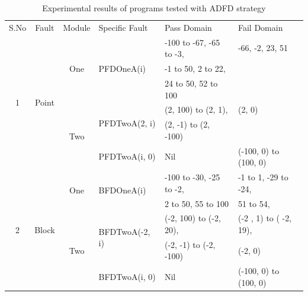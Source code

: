 \bigskip
\begin{table}[h]
\caption{Experimental results of programs tested with ADFD strategy}
\bigskip
\centering
{\renewcommand{\arraystretch}{1.3}
\scriptsize

\begin{tabular}{|c|c|c|l|l|l|}

\hline 


\multirow{2}{*}{S.No}	& \multirow{2}{*}{Fault }	 				& \multirow{2}{*}{Module} 		& \multirow{2}{*}{Specific Fault}	 		& \multirow{2}{*}{Pass Domain} 					& \multirow{2}{*}{Fail Domain} 			\\  
					& Domain								&  Dimension					&									&											&								\\ \hline 
\multirow{6}{*}{1} 	&	\multirow{6}{*}{Point}				& 	\multirow{3}{*}{One}			&	\multirow{3}{*}{PFDOneA(i)}	&	-100 to -67, -65 to -3, 		  		& -66, -2, 23, 51			 	\\  
				&									&							&							&	-1 to 50, 2 to 22, 					&							\\  
				&									&							&							&	24 to 50, 52 to 100					&							\\ \cline{3-6}
				&									&	\multirow{3}{*}{Two}			&	\multirow{2}{*}{PFDTwoA(2, i)}	&	(2, 100) to (2, 1),	 				&  (2, 0)						\\  
				&									&							&							&	(2, -1) to (2, -100)					&							\\ \cline{4-6}
				&									& 							&	PFDTwoA(i, 0)				&	Nil								& (-100, 0) to (100, 0)				\\  \hline



\multirow{5}{*}{2} 	&	\multirow{5}{*}{Block}				& 	\multirow{2}{*}{One}			&	\multirow{2}{*}{BFDOneA(i)}	&	-100 to -30, -25 to -2, 					& 	-1 to 1, -29 to -24,		 	\\ 
				&									&							&							&	2 to 50, 55 to 100						&	51 to 54,				\\   \cline{3-6}
				&									&	\multirow{3}{*}{Two}			&	\multirow{2}{*}{BFDTwoA(-2, i)}	&	(-2, 100) to (-2, 20), 					& 	(-2 , 1) to ( -2, 19), 		\\ 
				&									&							&							&      (-2, -1) to (-2, -100)					&	(-2, 0)				\\ \cline{4-6}
				&									& 							&	BFDTwoA(i, 0)				&	Nil								& 	(-100, 0) to (100, 0)		\\  \hline
				

\end{tabular}}
\end{table}
